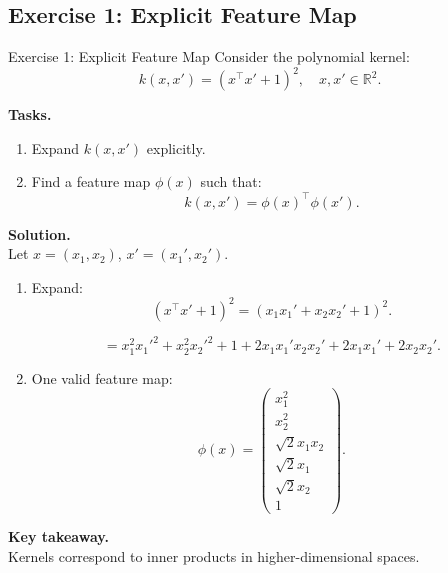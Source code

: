 \documentclass[aspectratio=169,11pt]{beamer}
\begin{document}
\subsection{Exercise 1: Explicit Feature Map}
\begin{frame}[t,allowframebreaks]{Exercise 1: Explicit Feature Map}
\small
Consider the polynomial kernel:
\[
k(x, x') = (x^\top x' + 1)^2, \quad x, x' \in \mathbb{R}^2.
\]

\textbf{Tasks.}\\ \begin{enumerate}
    \item Expand $k(x,x')$ explicitly.
    \item Find a feature map $\phi(x)$ such that:
    \[
    k(x,x') = \phi(x)^\top \phi(x').
    \]
\end{enumerate}

\textbf{Solution.}\\ Let $x = (x_1, x_2)$, $x' = (x_1', x_2')$.

\begin{enumerate}
\item Expand:
\[
(x^\top x' + 1)^2 =
(x_1 x_1' + x_2 x_2' + 1)^2.
\]

\[
= x_1^2 x_1'^2 + x_2^2 x_2'^2 + 1
+ 2 x_1 x_1' x_2 x_2'
+ 2 x_1 x_1' + 2 x_2 x_2'.
\]

\item One valid feature map:
\[
\phi(x) =
\begin{pmatrix}
x_1^2 \\
x_2^2 \\
\sqrt{2} x_1 x_2 \\
\sqrt{2} x_1 \\
\sqrt{2} x_2 \\
1
\end{pmatrix}.
\]
\end{enumerate}

\textbf{Key takeaway.}\\ Kernels correspond to inner products in higher-dimensional spaces.
\end{frame}
\end{document}
